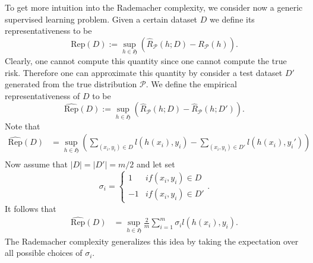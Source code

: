 To get more intuition into the Rademacher complexity, we consider now a generic
supervised learning problem. Given a certain dataset $D$ we define its
representativeness to be
$$
\text{Rep}(D) := \sup_{h \in \mathfrak{H}} (\hat{R}_\mathcal{P}(h;D) - R_\mathcal{P}(h)).
$$
Clearly, one cannot compute this quantity since one cannot compute the true
risk. Therefore one can approximate this quantity by consider a test dataset
$D'$ generated from the true distribution $\mathcal{P}$. We define the empirical
representativeness of $D$ to be 
$$
\hat{\text{Rep}}(D) := \sup_{h \in \mathfrak{H}} (\hat{R}_\mathcal{P}(h;D) - \hat{R}_{\mathcal{P}}(h;D')).
$$
Note that 
\begin{align*}
	\hat{\text{Rep}}(D) &= \sup_{h \in \mathfrak{H}} (\sum_{(x_i, y_i) \in D} l(h(x_i), y_i) - \sum_{(x_i, y_i) \in D'} l(h(x_i), y_i'))\\
\end{align*}
Now assume that $|D|=|D'|=m/2$ and let set 
\begin{equation*}
	\sigma_i= \begin{cases}
		1 & if (x_i, y_i) \in D\\
		-1 & if (x_i, y_i) \in D'
	\end{cases}.
\end{equation*}
It follows that 
\begin{align*}
	\hat{\text{Rep}}(D) 
	&= \sup_{h \in \mathfrak{H}} \frac{2}{m} \sum_{i=1}^{m} \sigma_i l(h(x_i), y_i).
\end{align*}
The Rademacher complexity generalizes this idea by taking the expectation over all possible choices of $\sigma_i$.

